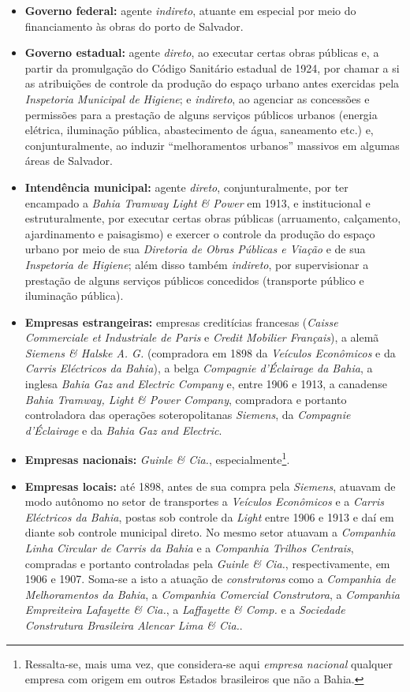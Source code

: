 \begin{itemize}
\item \textbf{Governo federal:} agente \textit{indireto}, atuante em especial por meio do financiamento às obras do porto de Salvador.
\item \textbf{Governo estadual:} agente \textit{direto}, ao executar certas obras públicas e, a partir da promulgação do Código Sanitário estadual de 1924, por chamar a si as atribuições de controle da produção do espaço urbano antes exercidas pela \textit{Inspetoria Municipal de Higiene}; e \textit{indireto}, ao agenciar as concessões e permissões para a prestação de alguns serviços públicos urbanos (energia elétrica, iluminação pública, abastecimento de água, saneamento etc.) e, conjunturalmente, ao induzir ``melhoramentos urbanos'' massivos em algumas áreas de Salvador.
\item \textbf{Intendência municipal:} agente \textit{direto}, conjunturalmente, por ter encampado a \textit{Bahia Tramway Light \& Power} em 1913, e institucional e estruturalmente, por executar certas obras públicas (arruamento, calçamento, ajardinamento e paisagismo) e exercer o controle da produção do espaço urbano por meio de sua \textit{Diretoria de Obras Públicas e Viação} e de sua \textit{Inspetoria de Higiene}; além disso também \textit{indireto}, por supervisionar a prestação de alguns serviços públicos concedidos (transporte público e iluminação pública). 
\item \textbf{Empresas estrangeiras:} empresas creditícias francesas (\textit{Caisse Commerciale et Industriale de Paris} e \textit{Credit Mobilier Français}), a alemã \textit{Siemens \& Halske A. G.} (compradora em 1898 da \textit{Veículos Econômicos} e da \textit{Carris Eléctricos da Bahia}), a belga \textit{Compagnie d'Éclairage da Bahia}, a inglesa \textit{Bahia Gaz and Electric Company} e, entre 1906 e 1913, a canadense \textit{Bahia Tramway, Light \& Power Company}, compradora e portanto controladora das operações soteropolitanas \textit{Siemens}, da \textit{Compagnie d'Éclairage} e da \textit{Bahia Gaz and Electric}.
\item \textbf{Empresas nacionais:} \textit{Guinle \& Cia.}, especialmente\footnote{Ressalta-se, mais uma vez, que considera-se aqui \textit{empresa nacional} qualquer empresa com origem em outros Estados brasileiros que não a Bahia.}.
\item \textbf{Empresas locais:} até 1898, antes de sua compra pela \textit{Siemens}, atuavam de modo autônomo no setor de transportes a \textit{Veículos Econômicos} e a \textit{Carris Eléctricos da Bahia}, postas sob controle da \textit{Light} entre 1906 e 1913 e daí em diante sob controle municipal direto. No mesmo setor atuavam a \textit{Companhia Linha Circular de Carris da Bahia} e a \textit{Companhia Trilhos Centrais}, compradas e portanto controladas pela \textit{Guinle \& Cia.}, respectivamente, em 1906 e 1907. Soma-se a isto a atuação de \textit{construtoras} como a \textit{Companhia de Melhoramentos da Bahia}, a \textit{Companhia Comercial Construtora}, a \textit{Companhia Empreiteira Lafayette \& Cia.}, a \textit{Laffayette \& Comp.} e a \textit{Sociedade Construtura Brasileira Alencar Lima \& Cia.}.

\end{itemize}
